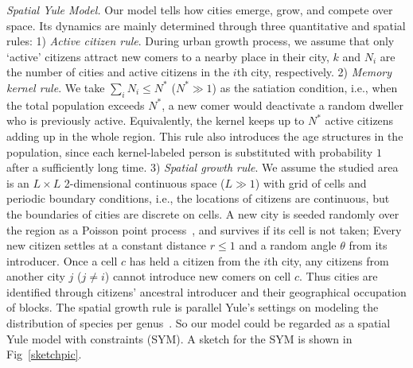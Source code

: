 \documentclass[reprint,unsortedaddress,amsmath,amssymb,aps,prl,showkeys]{revtex4-2}
\begin{document}
\textit{Spatial Yule Model.} Our model tells how cities emerge, grow, and compete over space. Its dynamics are mainly determined through three quantitative and spatial rules: 1) \textit{Active citizen rule}. During urban growth process, we assume that only `active' citizens attract new comers to a nearby place in their city, $k$ and $N_i$ are the number of cities and active citizens in the $i$th city, respectively. 2) \textit{Memory kernel rule}. We take $\sum_{i} N_i \le N^*$ ($N^* \gg 1$) as the satiation condition, i.e., when the total population exceeds $N^*$, a new comer would deactivate a random dweller who is previously active. Equivalently, the kernel keeps up to $N^*$ active citizens adding up in the whole region. This rule also introduces the age structures in the population, since each kernel-labeled person is substituted with probability $1$ after a sufficiently long time. 3) \emph{Spatial growth rule}. We assume the studied area is an $L\times L$ 2-dimensional continuous space ($L\gg 1$) with grid of cells and periodic boundary conditions, %
i.e., the locations of citizens are continuous, but the boundaries of cities are discrete on cells. A new city is seeded randomly over the region as a Poisson point process~\cite{miles1970homogeneous}, and survives if its cell is not taken; Every new citizen settles at a constant distance $r\le 1$ and a random angle $\theta$ from its introducer. Once a cell $c$ has held a citizen from the $i$th city, any citizens from another city $j$ ($j\ne i$) cannot introduce new comers on cell $c$. Thus cities are identified through citizens' ancestral introducer and their geographical occupation of blocks. The spatial growth rule is parallel Yule's settings on modeling the distribution of species per genus~\cite{yule1925ii}. So our model could be regarded as a spatial Yule model with constraints (SYM). A sketch for the SYM is shown in Fig~\ref{sketchpic}.
\end{document}
